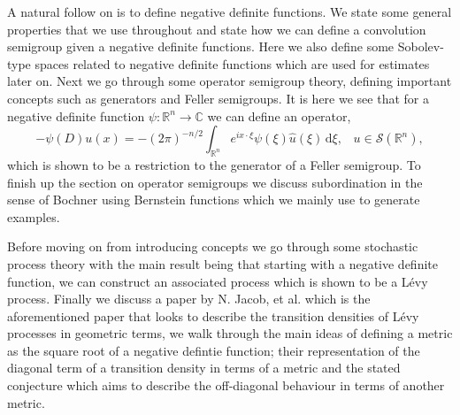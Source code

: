\documentclass[a4paper, 12pt]{report}
\theoremstyle{cor}
\theoremstyle{remark}
\theoremstyle{definition}
\begin{document}
A natural follow on is to define negative definite functions.  We state some general properties that we use throughout and state how we can define a convolution semigroup given a negative definite functions.  Here we also define some Sobolev-type spaces related to negative definite functions which are used for estimates later on.  Next we go through some operator semigroup theory, defining important concepts such as generators and Feller semigroups.  It is here we see that for a negative definite function $\psi : \mathbb{R}^n \to \mathbb{C}$ we can define an operator,
$$
-\psi(D)u(x) = -(2\pi)^{-n/2}\int_{\mathbb{R}^n}e^{ix\cdot\xi}\psi(\xi)\hat{u}(\xi)\,\mathrm{d}\xi, \,\,\,\,\, u \in \mathcal{S}(\mathbb{R}^n),
$$
which is shown to be a restriction to the generator of a Feller semigroup.  To finish up the section on operator semigroups we discuss subordination in the sense of Bochner using Bernstein functions which we mainly use to generate examples.

Before moving on from introducing concepts we go through some stochastic process theory with the main result being that starting with a negative definite function, we can construct an associated process which is shown to be a L\'evy process.  Finally we discuss a paper by N. Jacob, et al. \cite{Paper} which is the aforementioned paper that looks to describe the transition densities of L\'evy processes in geometric terms, we walk through the main ideas of defining a metric as the square root of a negative defintie function; their representation of the diagonal term of a transition density in terms of a metric and the stated conjecture which aims to describe the off-diagonal behaviour in terms of another metric.
\end{document}
